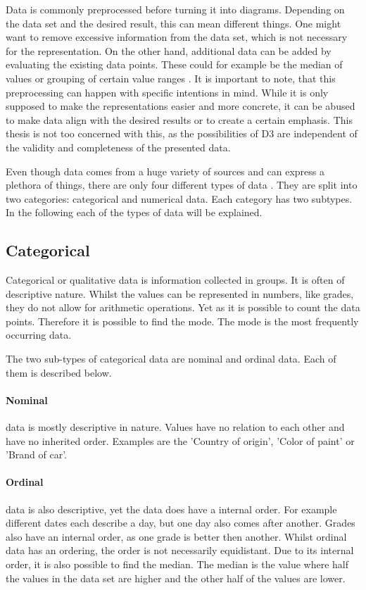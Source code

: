 Data is commonly preprocessed before turning it into diagrams. Depending on the data set and the desired result, this can mean different things. One might want to remove excessive information from the data set, which is not necessary for the representation. On the other hand, additional data can be added by evaluating the existing data points. These could for example be the median of values or grouping of certain value ranges \cite{garcia2015data}. It is important to note, that this preprocessing can happen with specific intentions in mind. While it is only supposed to make the representations easier and more concrete, it can be abused to make data align with the desired results or to create a certain emphasis. This thesis is not too concerned with this, as the possibilities of D3 are independent of the validity and completeness of the presented data.

Even though data comes from a huge variety of sources and can express a plethora of things, there are only four different types of data \cite{henze_2021}. They are split into two categories: categorical and numerical data. Each category has two subtypes. In the following each of the types of data will be explained.

\subsection{Categorical}

Categorical or qualitative data is information collected in groups. It is often of descriptive nature. Whilst the values can be represented in numbers, like grades, they do not allow for arithmetic operations. Yet as it is possible to count the data points. Therefore it is possible to find the mode. The mode is the most frequently occurring data.

The two sub-types of categorical data are nominal and ordinal data. Each of them is described below.

\paragraph{Nominal}
data is mostly descriptive in nature. Values have no relation to each other and have no inherited order. Examples are the 'Country of origin', 'Color of paint' or 'Brand of car'.

\paragraph{Ordinal}
data is also descriptive, yet the data does have a internal order. For example different dates each describe a day, but one day also comes after another. Grades also have an internal order, as one grade is better then another. Whilst ordinal data has an ordering, the order is not necessarily equidistant. Due to its internal order, it is also possible to find the median. The median is the value where half the values in the data set are higher and the other half of the values are lower.

